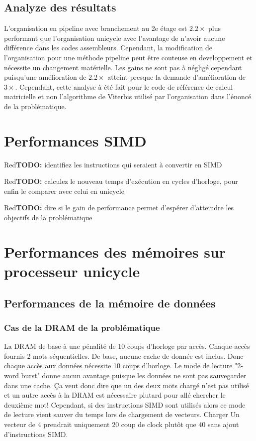 \documentclass[a11paper]{article}
\newcommand{\todo}[1]{\begin{color}{Red}\textbf{TODO:} #1\end{color}}
\begin{document}
\subsection{Analyze des résultats}
L'organisation en pipeline avec branchement au 2e étage est $2.2\times$ plus performant que l'organisation unicycle avec l'avantage de n'avoir aucune différence dans les codes assembleurs.
Cependant, la modification de l'organisation pour une méthode pipeline peut être couteuse en developpement et nécessite un changement matérielle. Les gains ne sont pas à négligé cependant puisqu'une
amélioration de $2.2\times$ atteint presque la demande d'amélioration de $3\times$. Cependant, cette analyse à été fait pour le code de référence de calcul matricielle et non l'algorithme de Viterbis
utilisé par l'organisation dans l'énoncé de la problématique.


\section{Performances SIMD}

\todo{identifiez les instructions qui seraient à convertir en SIMD}

\todo{calculez le nouveau temps d'exécution en cycles d'horloge, pour enfin le
comparer avec celui en unicycle}

\todo{dire si le gain de performance permet d'espérer d'atteindre les objectifs
de la problématique}



\section{Performances des mémoires sur processeur unicycle}
\subsection{Performances de la mémoire de données}
\subsubsection{Cas de la DRAM de la problématique}
La DRAM de base à une pénalité de 10 coups d'horloge par accès. Chaque accès fournis 2 mots séquentielles. De base, aucune cache de donnée est inclus. Donc chaque accès aux données
nécessite 10 coups d'horloge. Le mode de lecture "2-word burst" donne aucun avantage puisque les données ne sont pas sauvegarder dans une cache. Ça veut donc dire que un des deux
mots chargé n'est pas utilisé et un autre accès à la DRAM est nécessaire plutard pour allé chercher le deuxième mot! Cependant, si des instructions SIMD sont utilisés alors ce mode
de lecture vient sauver du temps lors de chargement de vecteurs. Charger Un vecteur de $4$ prendrait uniquement $20$ coup de clock plutôt que $40$ sans ajout d'instructions SIMD.
\end{document}
